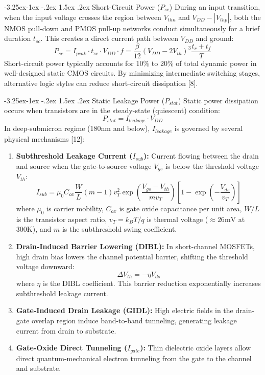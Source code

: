 \documentclass[12pt,a4paper,oneside]{report}
\makeatletter
\renewcommand\subsection{\@startsection{subsection}{2}{\z@}%
                                     {-3.25ex\@plus -1ex \@minus -.2ex}%
                                     {1.5ex \@plus .2ex}%
                                     {\normalfont\normalsize\bfseries\itshape}}
\makeatother
\begin{document}
\subsection{Short-Circuit Power ($P_{sc}$)}
During an input transition, when the input voltage crosses the region between $V_{thn}$ and $V_{DD} - |V_{thp}|$, both the NMOS pull-down and PMOS pull-up networks conduct simultaneously for a brief duration $t_{sc}$. This creates a direct current path between $V_{DD}$ and ground:
\begin{equation}
P_{sc} = I_{peak} \cdot t_{sc} \cdot V_{DD} \cdot f = \frac{\beta}{12} (V_{DD} - 2V_{th})^3 \frac{t_r + t_f}{T}
\end{equation}
Short-circuit power typically accounts for 10\% to 20\% of total dynamic power in well-designed static CMOS circuits. By minimizing intermediate switching stages, alternative logic styles can reduce short-circuit dissipation [8].

\subsection{Static Leakage Power ($P_{stat}$)}
Static power dissipation occurs when transistors are in the steady-state (quiescent) condition:
\begin{equation}
P_{stat} = I_{leakage} \cdot V_{DD}
\end{equation}
In deep-submicron regime (180nm and below), $I_{leakage}$ is governed by several physical mechanisms [12]:
\begin{enumerate}
\item \textbf{Subthreshold Leakage Current ($I_{sub}$):} Current flowing between the drain and source when the gate-to-source voltage $V_{gs}$ is below the threshold voltage $V_{th}$:
\begin{equation}
I_{sub} = \mu_0 C_{ox} \frac{W}{L} (m-1) v_T^2 \exp\left(\frac{V_{gs} - V_{th}}{m v_T}\right) \left[1 - \exp\left(-\frac{V_{ds}}{v_T}\right)\right]
\label{eq:isub}
\end{equation}
where $\mu_0$ is carrier mobility, $C_{ox}$ is gate oxide capacitance per unit area, $W/L$ is the transistor aspect ratio, $v_T = k_B T / q$ is thermal voltage ($\approx 26\text{mV}$ at $300\text{K}$), and $m$ is the subthreshold swing coefficient.
\item \textbf{Drain-Induced Barrier Lowering (DIBL):} In short-channel MOSFETs, high drain bias lowers the channel potential barrier, shifting the threshold voltage downward:
\begin{equation}
\Delta V_{th} = -\eta V_{ds}
\end{equation}
where $\eta$ is the DIBL coefficient. This barrier reduction exponentially increases subthreshold leakage current.
\item \textbf{Gate-Induced Drain Leakage (GIDL):} High electric fields in the drain-gate overlap region induce band-to-band tunneling, generating leakage current from drain to substrate.
\item \textbf{Gate-Oxide Direct Tunneling ($I_{gate}$):} Thin dielectric oxide layers allow direct quantum-mechanical electron tunneling from the gate to the channel and substrate.
\end{enumerate}
\end{document}
